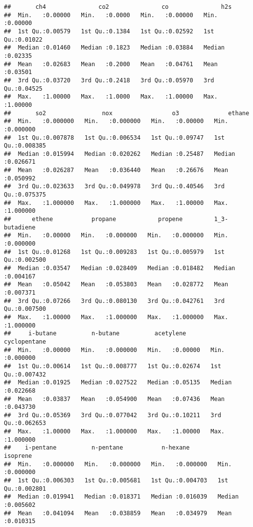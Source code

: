 \documentclass[
]{article}
\begin{document}
\begin{verbatim}
##       ch4               co2               co               h2s         
##  Min.   :0.00000   Min.   :0.0000   Min.   :0.00000   Min.   :0.00000  
##  1st Qu.:0.00579   1st Qu.:0.1384   1st Qu.:0.02592   1st Qu.:0.01022  
##  Median :0.01460   Median :0.1823   Median :0.03884   Median :0.02335  
##  Mean   :0.02683   Mean   :0.2000   Mean   :0.04761   Mean   :0.03501  
##  3rd Qu.:0.03720   3rd Qu.:0.2418   3rd Qu.:0.05970   3rd Qu.:0.04525  
##  Max.   :1.00000   Max.   :1.0000   Max.   :1.00000   Max.   :1.00000  
##       so2                nox                 o3              ethane        
##  Min.   :0.000000   Min.   :0.000000   Min.   :0.00000   Min.   :0.000000  
##  1st Qu.:0.007878   1st Qu.:0.006534   1st Qu.:0.09747   1st Qu.:0.008385  
##  Median :0.015994   Median :0.020262   Median :0.25487   Median :0.026671  
##  Mean   :0.026287   Mean   :0.036440   Mean   :0.26676   Mean   :0.050992  
##  3rd Qu.:0.023633   3rd Qu.:0.049978   3rd Qu.:0.40546   3rd Qu.:0.075375  
##  Max.   :1.000000   Max.   :1.000000   Max.   :1.00000   Max.   :1.000000  
##      ethene           propane            propene         1_3-butadiene     
##  Min.   :0.00000   Min.   :0.000000   Min.   :0.000000   Min.   :0.000000  
##  1st Qu.:0.01268   1st Qu.:0.009283   1st Qu.:0.005979   1st Qu.:0.002500  
##  Median :0.03547   Median :0.028409   Median :0.018482   Median :0.004167  
##  Mean   :0.05042   Mean   :0.053803   Mean   :0.028772   Mean   :0.007371  
##  3rd Qu.:0.07266   3rd Qu.:0.080130   3rd Qu.:0.042761   3rd Qu.:0.007500  
##  Max.   :1.00000   Max.   :1.000000   Max.   :1.000000   Max.   :1.000000  
##     i-butane          n-butane          acetylene        cyclopentane     
##  Min.   :0.00000   Min.   :0.000000   Min.   :0.00000   Min.   :0.000000  
##  1st Qu.:0.00614   1st Qu.:0.008777   1st Qu.:0.02674   1st Qu.:0.007432  
##  Median :0.01925   Median :0.027522   Median :0.05135   Median :0.022668  
##  Mean   :0.03837   Mean   :0.054900   Mean   :0.07436   Mean   :0.043730  
##  3rd Qu.:0.05369   3rd Qu.:0.077042   3rd Qu.:0.10211   3rd Qu.:0.062653  
##  Max.   :1.00000   Max.   :1.000000   Max.   :1.00000   Max.   :1.000000  
##    i-pentane          n-pentane           n-hexane           isoprene       
##  Min.   :0.000000   Min.   :0.000000   Min.   :0.000000   Min.   :0.000000  
##  1st Qu.:0.006303   1st Qu.:0.005681   1st Qu.:0.004703   1st Qu.:0.002801  
##  Median :0.019941   Median :0.018371   Median :0.016039   Median :0.005602  
##  Mean   :0.041094   Mean   :0.038859   Mean   :0.034979   Mean   :0.010315  

\end{verbatim}
\end{document}
